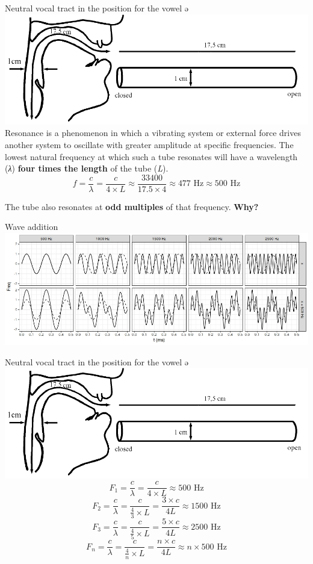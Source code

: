 \begin{frame}{Neutral vocal tract in the position for the vowel ə}
\includegraphics[width=0.8\linewidth]{12-shwa-tube.png}\\
Resonance is a phenomenon in which a vibrating system or external force drives another system to oscillate with greater amplitude at specific frequencies. The lowest natural frequency at which such a tube resonates will have a wavelength (\textit{λ}) \textbf{four times the length} of the tube (\textit{L}).
$$f = \frac{c}{\lambda} = \frac{c}{4 \times L} \approx \frac{33400}{17.5 \times 4} \approx 477 \text{ Hz} \approx 500 \text{ Hz}$$

The tube also resonates at \textbf{odd multiples} of that frequency. \pause \textbf{Why?}
\end{frame}

\begin{frame}{Wave addition}
\includegraphics[width=\linewidth]{13-waves.jpeg}\\
\end{frame}

\begin{frame}{Neutral vocal tract in the position for the vowel ə}
\includegraphics[width=0.8\linewidth]{12-shwa-tube.png}\\
$$F_1 = \frac{c}{\lambda} = \frac{c}{4 \times L} \approx 500 \text{ Hz}$$
$$F_2 = \frac{c}{\lambda} = \frac{c}{\frac{4}{3} \times L} = \frac{3 \times c}{4 L} \approx 1500 \text{ Hz}$$
$$F_3 = \frac{c}{\lambda} = \frac{c}{\frac{4}{5} \times L} = \frac{5 \times c}{4 L} \approx 2500 \text{ Hz}$$
$$F_n = \frac{c}{\lambda} = \frac{c}{\frac{4}{n} \times L} = \frac{n \times c}{4 L} \approx n \times 500 \text{ Hz}$$
\end{frame}

